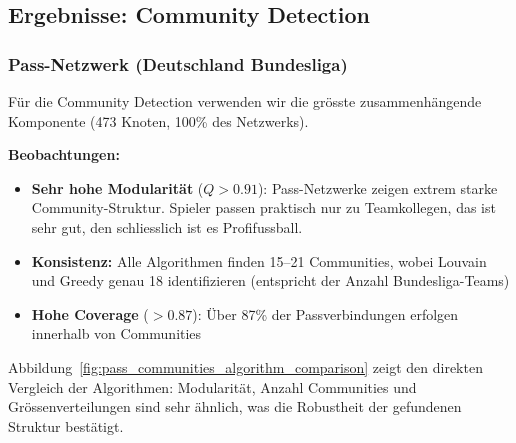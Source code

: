 \subsection{Ergebnisse: Community Detection}

\subsubsection{Pass-Netzwerk (Deutschland Bundesliga)}

Für die Community Detection verwenden wir die grösste zusammenhängende Komponente (473 Knoten, 100\% des Netzwerks).

\begin{table}[h]
\centering
\caption{Algorithmenvergleich auf Pass-Netzwerk (Deutschland, grösste Komponente)}
\label{tab:pass_community_results}
\end{table}

\textbf{Beobachtungen:}
\begin{itemize}
  \item \textbf{Sehr hohe Modularität} ($Q > 0.91$): Pass-Netzwerke zeigen extrem starke Community-Struktur. Spieler passen praktisch nur zu Teamkollegen, das ist sehr gut, den schliesslich ist es Profifussball.
  \item \textbf{Konsistenz:} Alle Algorithmen finden 15--21 Communities, wobei Louvain und Greedy genau 18 identifizieren (entspricht der Anzahl Bundesliga-Teams)
  \item \textbf{Hohe Coverage} ($> 0.87$): Über 87\% der Passverbindungen erfolgen innerhalb von Communities
\end{itemize}

Abbildung~\ref{fig:pass_communities_algorithm_comparison} zeigt den direkten Vergleich der Algorithmen: Modularität, Anzahl Communities und Grössenverteilungen sind sehr ähnlich, was die Robustheit der gefundenen Struktur bestätigt.

